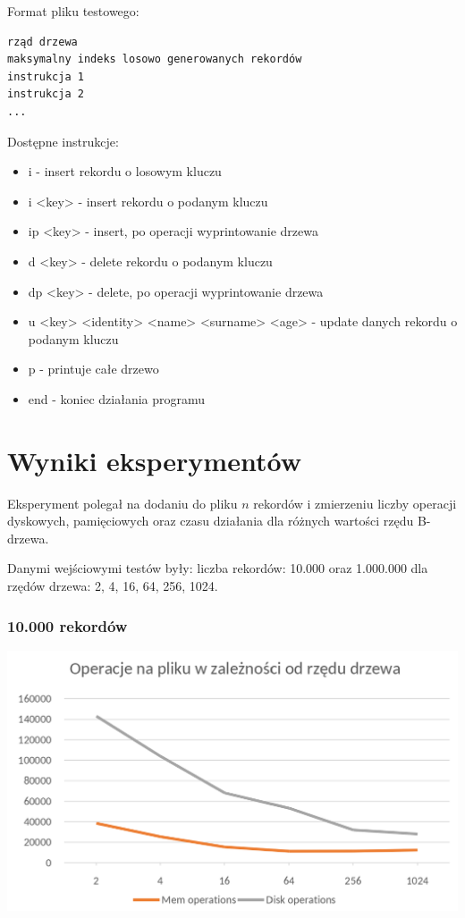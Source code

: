\documentclass[11pt,a4paper]{article}
\begin{document}
Format pliku testowego:

\begin{verbatim}
rząd drzewa
maksymalny indeks losowo generowanych rekordów
instrukcja 1
instrukcja 2
...
\end{verbatim}

Dostępne instrukcje:

\begin{itemize}
\item i - insert rekordu o losowym kluczu
\item i <key> - insert rekordu o podanym kluczu
\item ip <key> - insert, po operacji wyprintowanie drzewa
\item d <key> - delete rekordu o podanym kluczu
\item dp <key> - delete, po operacji wyprintowanie drzewa
\item u <key> <identity> <name> <surname> <age> - update danych rekordu o podanym kluczu
\item p - printuje całe drzewo
\item end - koniec działania programu
\end{itemize}

\newpage
\section*{Wyniki eksperymentów}

Eksperyment polegał na dodaniu do pliku $n$ rekordów i zmierzeniu liczby operacji dyskowych, pamięciowych oraz czasu działania dla różnych wartości rzędu B-drzewa.

Danymi wejściowymi testów były: liczba rekordów: 10.000 oraz 1.000.000 dla rzędów drzewa: 2, 4, 16, 64, 256, 1024.

\subsubsection*{10.000 rekordów}

\includegraphics[scale=0.3]{sbd_operations_10k.png} 
\end{document}
